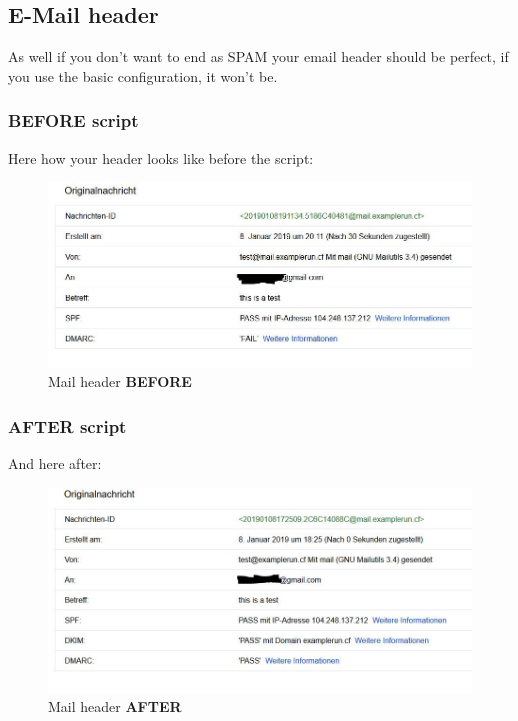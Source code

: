 \subsection{E-Mail header} 
As well if you don't want to end as SPAM your email header should be perfect, if you use the basic configuration, it won't be.
\subsubsection{BEFORE script}
Here how your header looks like before the script:
\begin{figure}[H]
	\centering
	\includegraphics[width=\linewidth]{pics/mailheader_before}
	\caption{Mail header \textbf{BEFORE}}
	\label{fig:mailheaderbefore}
\end{figure}

\subsubsection{AFTER script}
And here after:
\begin{figure}[H]
	\centering
	\includegraphics[width=\linewidth]{pics/mailheader_after}
	\caption{Mail header \textbf{AFTER}}
	\label{fig:mailheaderbefore}
\end{figure}
\newpage
